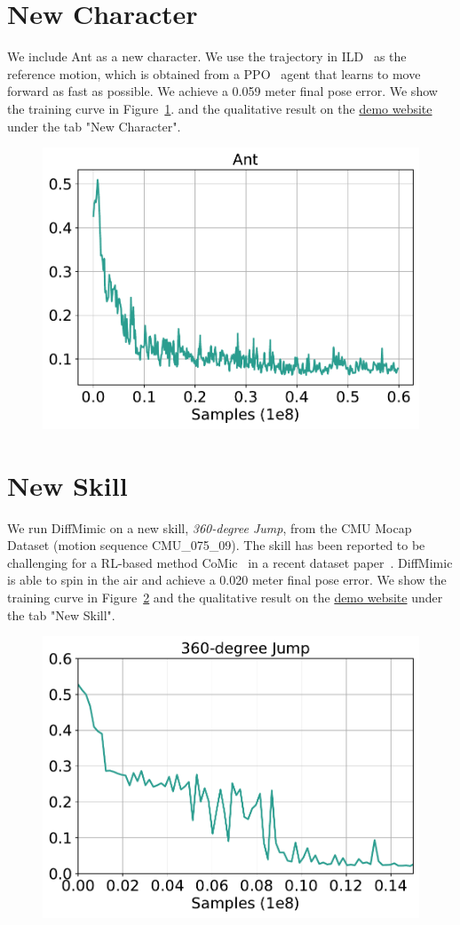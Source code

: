 \clearpage

\section{{New Character}}
{We include Ant as a new character. We use the trajectory in ILD~\citep{chen2022imitation} as the reference motion, which is obtained from a PPO~\citep{schulman2017proximal} agent that learns to move forward as fast as possible. We achieve a 0.059 meter final pose error. We show the training curve in Figure~\ref{fig:ant}.} and the qualitative result on the  \href{https://diffmimic-demo-main-g7h0i8.streamlit.app/}{demo website} under the tab "New Character".
\begin{figure}[h]
    \centering
    \includegraphics[width=.4\textwidth]{figures/Ant.pdf}
    \label{fig:ant}
\end{figure}


\section{{New Skill}}
{We run DiffMimic on a new skill, \emph{360-degree Jump}, from the CMU Mocap Dataset (motion sequence CMU\_075\_09). The skill has been reported to be challenging for a RL-based method CoMic~\citep{hasenclever2020comic} in a recent dataset paper~\citep{wagener2022mocapact}. DiffMimic is able to spin in the air and achieve a 0.020 meter final pose error. We show the training curve in Figure~\ref{fig:360-degree Jump}} and the qualitative result on the \href{https://diffmimic-demo-main-g7h0i8.streamlit.app/}{demo website} under the tab "New Skill".


\begin{figure}[h]
    \centering
    \includegraphics[width=.4\textwidth]{figures/rebuttal/360-degree-Jump.pdf}
    \label{fig:360-degree Jump}
\end{figure}


